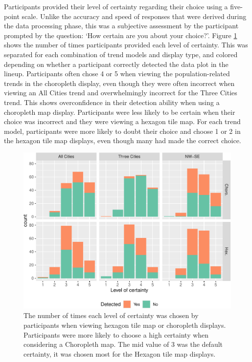 \documentclass[times, doublespace]{anzsauth}
\begin{document}
Participants provided their level of certainty regarding their choice
using a five-point scale. Unlike the accuracy and speed of responses
that were derived during the data processing phase, this was a
subjective assessment by the participant prompted by the question: `How
certain are you about your choice?'. Figure \ref{fig:certainty} shows the
number of times participants provided each level of certainty. This was
separated for each combination of trend models and display type, and
colored depending on whether a participant correctly detected the data
plot in the lineup. Participants often chose 4 or 5 when viewing the
population-related trends in the choropleth display, even though they
were often incorrect when viewing an All Cities trend and overwhelmingly
incorrect for the Three Cities trend. This shows overconfidence in their
detection ability when using a choropleth map display. Participants were
less likely to be certain when their choice was incorrect and they were
viewing a hexagon tile map. For each trend model, participants were more
likely to doubt their choice and choose 1 or 2 in the hexagon tile map
displays, even though many had made the correct choice.

\begin{figure}
\includegraphics[width=1\linewidth]{paper_files/figure-latex/certainty-1} \caption{The number of times each level of certainty was chosen by participants when viewing hexagon tile map or choropleth displays. Participants were more likely to choose a high certainty when considering a Choropleth map. The mid value of 3 was the default certainty, it was chosen most for the Hexagon tile map displays.}\label{fig:certainty}
\end{figure}
\end{document}
